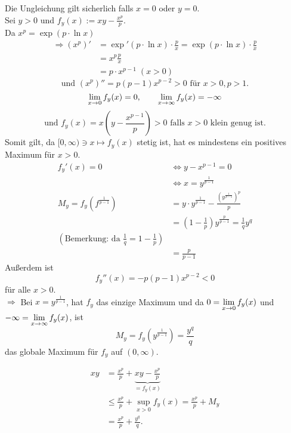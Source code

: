 \documentclass[../ana1.tex]{subfiles}
\begin{document}
\begin{bew}
    Die Ungleichung gilt sicherlich falls \( x=0 \) oder 
    \( y = 0 \). \\
    Sei \( y > 0 \) und \( f_y(x) := xy - \frac{x^p}{p} \). \\
    Da \( x^p = \exp(p \cdot \ln x) \)
    \begin{align*}
        \Rightarrow (x^p)' &= \exp'(p \cdot \ln x)
        \cdot \frac{p}{x} = \exp(p \cdot \ln x) 
        \cdot \frac{p}{x} \\
        &= x^p \frac{p}{x} \\
        &= p \cdot x^{p-1} \; (x>0)        
    \end{align*}
    \[ \text{und } (x^p)'' = p (p-1) x^{p-2} > 0 
    \text{ für } x > 0, p > 1. \]
    \[ \lim\limits_{x\rightarrow 0} f_y(x) = 0, \qquad 
    \lim\limits_{x\rightarrow\infty} f_y(x) = -\infty \]
    \[ \text{und } f_y(x) = x\left( y 
    - \frac{x^{p-1}}{p} \right) >0 
    \text{ falls } x>0 \text{ klein genug ist.} \]
    Somit gilt, da \( [0,\infty) \ni x \mapsto f_y(x) \) 
    stetig ist, hat es mindestens ein positives Maximum für 
    \( x > 0 \).
    \begin{align*}
        f_y'(x) = 0 &\Leftrightarrow y - x^{p-1} = 0 \\
        &\Leftrightarrow x = y^{\frac{1}{p-1}} \\
        M_y = f_y(f^{\frac{1}{p-1}}) 
        &= y \cdot y^{\frac{1}{p-1}} 
        - \frac{ (y^{\frac{1}{p-1}})^p }{ p } \\
        &= (1- \frac{1}{p}) y^{\frac{p}{p-1}} 
        = \frac{1}{q} y^q \\
        \left( \text{Bemerkung: da } \frac{1}{q} = 1 - \frac{1}{p} \right) \\ 
        &= \frac{p}{p-1}
    \end{align*} 
    Außerdem ist 
    \[ f_y''(x) = -p(p-1)x^{p-2} < 0 \]
    für alle \( x > 0 \).\\
    \( \Rightarrow \) Bei \( x = y^{\frac{1}{p-1}} \), hat 
    \( f_y \) das einzige Maximum und da 
    \( 0 = \lim\limits_{x\rightarrow 0} f_y(x) \) und 
    \( -\infty = \lim\limits_{x\rightarrow \infty} f_y(x) \), ist 
    \[ M_y = f_y \left( y^{\frac{1}{p-1}} \right) 
    = \frac{y^q}{q} \] 
    das globale Maximum für \( f_y \) auf \( (0,\infty) \).

    \begin{align*}
        xy &= \frac{x^p}{p} + \underbrace{xy - \frac{x^p}{p}}_{
            = f_y(x)
        } \\
        &\leq \frac{x^p}{p} + \underset{x>0}{\sup} f_y(x) 
        = \frac{x^p}{p} + M_y \\
        &= \frac{x^p}{p} + \frac{y^q}{q}.
    \end{align*}
\end{bew}
\end{document}
